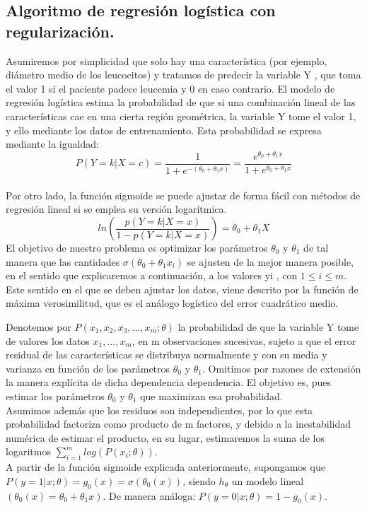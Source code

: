 \documentclass[a4paper,10pt]{article}
\begin{document}
\subsection{Algoritmo de regresión logística con regularización.}

Asumiremos por simplicidad que solo hay una característica (por ejemplo,
diámetro medio de los leucocitos) y tratamos de predecir la variable Y , que
toma el valor 1 si el paciente padece leucemia y 0 en caso contrario. El modelo
de regresión logística estima la probabilidad de que si una combinación lineal de
las características cae en una cierta región geométrica, la variable Y tome el
valor 1, y ello mediante los datos de entrenamiento. Esta probabilidad se expresa
mediante la igualdad:
\[
P(Y=k|X=c)=\frac{1}{1+e^{-(\theta_0+\theta_1 x)}}=\frac{e^{\theta_0+\theta_1 x}}{1+e^{\theta_0+\theta_1 x}}
\]
\\
Por otro lado, la función sigmoide se puede ajustar de forma fácil con
métodos de regresión lineal si se emplea su versión logarítmica.
\[
ln\left( \frac{p(Y=k|X=x)}{1-p(Y=k|X=x)}\right)=\theta_0 + \theta_1 X
\]
El objetivo de nuestro problema es optimizar los parámetros $\theta_0$ y $\theta_1$ de tal
manera que las cantidades $\sigma (\theta_0 + \theta_1 x_{i})$ se ajusten de la mejor manera posible,
en el sentido que explicaremos a continuación, a los valores yi
, con $1 \leq i \leq m$.
Este sentido en el que se deben ajustar los datos, viene descrito por la función de
máxima verosimilitud, que es el análogo logístico del error cuadrático medio.

Denotemos por $P(x_1, x_2, x_3, ..., x_m; \theta)$ la probabilidad de que la variable Y tome
de valores los datos $x_1, ..., x_m$, en m observaciones sucesivas, sujeto a que el error
residual de las características se distribuya normalmente y con su media y varianza en función de los parámetros $\theta_0$ y $\theta_1$. Omitimos por razones de extensión la
manera explícita de dicha dependencia dependencia. El objetivo es, pues estimar
los parámetros $\theta_0$ y $\theta_1$ que maximizan esa probabilidad.\\
Asumimos además que los residuos son independientes, por lo que esta probabilidad factoriza como producto de m factores, y debido a la inestabilidad
numérica de estimar el producto, en su lugar, estimaremos la suma de los logaritmos $\sum_{i=1}^m log(P(x_i ;\theta))$.
\\

A partir de la función sigmoide explicada anteriormente,
supongamos que $P(y = 1 | x; \theta) = g_0(x) = \sigma(\theta_0(x))$, siendo $h_{\theta}$ un
modelo lineal $(\theta_0(x) = \theta_0 + \theta_1 x)$. De manera análoga:  $P(y = 0 | x; \theta) = 1-g_0(x)$.
\end{document}
